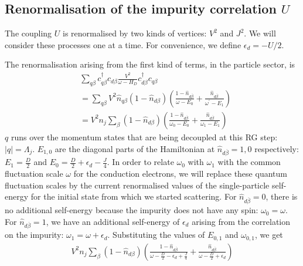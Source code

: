 \documentclass[reprint,superscriptaddress,floatfix]{revtex4-2}
\begin{document}
\subsection{Renormalisation of the impurity correlation \(U\)}
The coupling \(U\) is renormalised by two kinds of vertices: \(V^2\) and \(J^2\). We will consider these processes one at a time. For convenience, we define \(\epsilon_d = -U/2\).

The renormalisation arising from the first kind of terms, in the particle sector, is
\begin{equation}\begin{aligned}
	&\sum_{q\beta}c^\dagger_{q\beta}c_{d\beta}\frac{V^2}{\omega - H_D}c^\dagger_{d\beta}c_{q\beta}\\
	&= \sum_{q\beta}V^2 \hat n_{q\beta} \left( 1 - \hat n_{d\beta} \right)\left( \frac{1-\hat n_{d \overline\beta }}{\omega - E_0} + \frac{\hat n_{d \overline\beta}}{\omega^\prime - E_1}\right) \\
	&= V^2 n_j\sum_{\beta}\left( 1 - \hat n_{d\beta} \right)\left( \frac{1-\hat n_{d \overline\beta }}{\omega_0 - E_0} + \frac{\hat n_{d \overline\beta}}{\omega_1 - E_1}\right)
\end{aligned}\end{equation}
\(q\) runs over the momentum states that are being decoupled at this RG step: \(|q| = \Lambda_j\). \(E_{1,0}\) are the diagonal parts of the Hamiltonian at \(\hat n_{d\overline \beta}=1,0\) respectively: \(E_1 = \frac{D}{2}\) and \(E_0 = \frac{D}{2} + \epsilon_d - \frac{J}{4}\). In order to relate \(\omega_0\) with \(\omega_1\) with the common fluctuation scale \(\omega\) for the conduction electrons, we will replace these quantum fluctuation scales by the current renormalised values of the single-particle self-energy for the initial state from which we started scattering. For \(\hat n_{d\overline\beta}=0\), there is no additional self-energy because the impurity does not have any spin: \(\omega_0 = \omega\). For \(\hat n_{d\overline\beta} = 1\), we have an additional self-energy of \(\epsilon_d\) arising from the correlation on the impurity: \(\omega_1 = \omega + \epsilon_d\).
Substituting the values of \(E_{0,1}\) and \(\omega_{0,1}\), we get
\begin{equation}\begin{aligned}
	\label{ren_ed_Vp}
	V^2 n_j\sum_{\beta}\left( 1 - \hat n_{d\beta} \right)\left( \frac{1-\hat n_{d \overline\beta }}{\omega - \frac{D}{2} - \epsilon_d + \frac{J}{4}} + \frac{\hat n_{d \overline\beta}}{\omega - \frac{D}{2} + \epsilon_d}\right)
\end{aligned}\end{equation}
\end{document}
